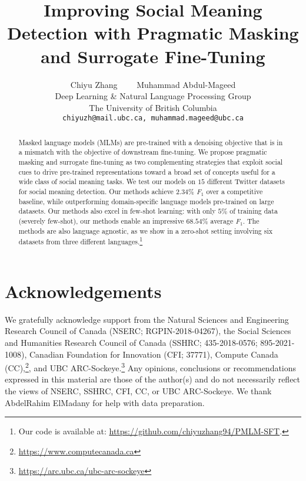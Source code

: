 \documentclass[11pt]{article}
\title{Improving Social Meaning Detection with Pragmatic Masking and Surrogate Fine-Tuning}
\author{Chiyu Zhang  ~~~~Muhammad Abdul-Mageed  \\ 
  Deep Learning \& Natural Language Processing Group \\The University of British Columbia \\
  \tt chiyuzh@mail.ubc.ca, \tt muhammad.mageed@ubc.ca}
\begin{document}
\maketitle
\begin{abstract}
Masked language models (MLMs) are pre-trained with a denoising objective that is in a mismatch with the objective of downstream fine-tuning. We propose pragmatic masking and surrogate fine-tuning as two complementing strategies that exploit social cues to drive pre-trained representations toward a broad set of concepts useful for a wide class of social meaning tasks.   
We test our models on $15$ different Twitter datasets for social meaning detection. Our methods achieve $2.34\%$ \textit{F}$_1$ over a competitive baseline, while outperforming domain-specific language models pre-trained on large datasets. Our methods also excel in few-shot learning: with only $5\%$ of training data (severely few-shot), our methods enable an impressive $68.54\%$ average \textit{F}$_1$. The methods are also language agnostic, as we show in a zero-shot setting involving six datasets from three different languages.\footnote{Our code is available at: \url{https://github.com/chiyuzhang94/PMLM-SFT}.}
\end{abstract}









\section*{Acknowledgements}\label{sec:acknow}
We gratefully acknowledge support from the Natural Sciences and Engineering Research Council of Canada (NSERC; RGPIN-2018-04267), the Social Sciences and Humanities Research Council of Canada (SSHRC; 435-2018-0576; 895-2021-1008), Canadian Foundation for Innovation (CFI; 37771), Compute Canada (CC),\footnote{\href{https://www.computecanada.ca}{https://www.computecanada.ca}}, and UBC ARC-Sockeye.\footnote{\href{https://arc.ubc.ca/ubc-arc-sockeye}{https://arc.ubc.ca/ubc-arc-sockeye}} Any opinions, conclusions or recommendations expressed in this material are those of the author(s) and do not necessarily reflect the views of NSERC, SSHRC, CFI, CC, or UBC ARC-Sockeye. We thank AbdelRahim ElMadany for help with data preparation. 


\appendix

\end{document}
